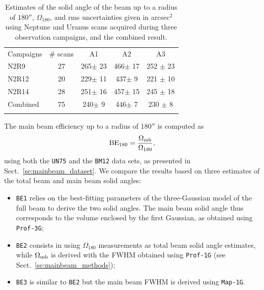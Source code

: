 \begin{table}[!h]
\caption{Estimates of the solid angle of the beam up to a radius of $180''$,
  $\Omega_{180}$, and rms uncertainties given in arcsec$^{2}$ using Neptune and Uranus
  scans acquired during three observation campaigns, and the combined
  result. }
\label{tab:solid}
\centering
\begin{tabular}{l cccc}
\hline\hline
\noalign{\smallskip}
Campaigns  & \# scans & %
A1    &    A2   &  A3  \\%
\noalign{\smallskip}
\hline
\noalign{\smallskip}
N2R9     & 27  &  265$\pm$ 23    &  466$\pm$ 17 & 252 $\pm$ 23 \\%
N2R12    & 20  &  229$\pm$ 11    &  437$\pm$  9 & 221 $\pm$ 10 \\%
N2R14    & 28  &  251$\pm$ 16    &  457$\pm$ 15 & 245 $\pm$ 18 \\%
Combined & 75  &  240$\pm$  9    &  446$\pm$  7 & 230 $\pm$  8 \\%
\noalign{\smallskip}
\hline
\end{tabular}
\end{table}

{\lp The main beam efficiency up to a radius of $180''$ is computed as
\begin{equation}
\rm{BE}_{180} = \frac{\Omega_{\rm{mb}}}{\Omega_{180}},
\end{equation}
}
using both the {\tt UN75} and the {\tt BM12} data sets, as presented in
Sect.~\ref{se:mainbeam_dataset}. We compare the results based on three
estimates of the total beam and main beam solid angles: 
\begin{itemize}
  \item{{\tt BE1} relies on the best-fitting parameters of the
    three-Gaussian model of the full beam to derive the two solid
    angles. The main beam solid angle thus corresponds to the volume
    enclosed by the first Gaussian, as obtained using {\tt Prof-3G};}
  \item{{\tt BE2} consists in using $\Omega_{180}$ measurements as
    total beam solid angle estimates, while $\Omega_{\rm{mb}}$ is
    derived with the FWHM obtained using {\tt Prof-1G} (see
    Sect.~\ref{se:mainbeam_methods});}
  \item{{\tt BE3} is similar to {\tt BE2} but the main beam FWHM is
    derived using {\tt Map-1G}.}  
\end{itemize}

